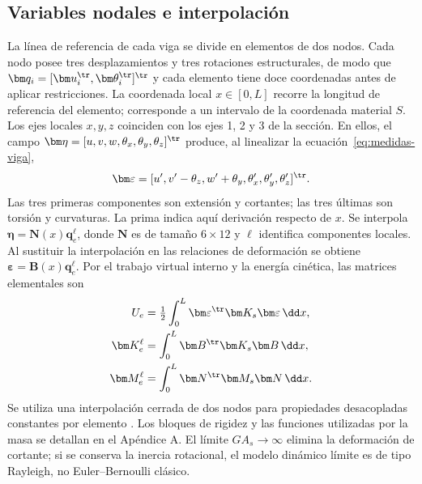 \subsection{Variables nodales e interpolación}
La línea de referencia de cada viga se divide en elementos de dos nodos. Cada nodo posee tres desplazamientos y tres rotaciones estructurales, de modo que
$\bm q_i=[\bm u_i^\tr,\bm\theta_i^\tr]^\tr$ y cada elemento tiene doce coordenadas antes de aplicar restricciones. La coordenada local $x\in[0,L]$ recorre la longitud de referencia del elemento; corresponde a un intervalo de la coordenada material $S$. Los ejes locales $x,y,z$ coinciden con los ejes 1, 2 y 3 de la sección. En ellos, el campo
$\bm\eta=[u,v,w,\theta_x,\theta_y,\theta_z]^\tr$
produce, al linealizar la ecuación~\eqref{eq:medidas-viga},
\begin{equation}
\bm\varepsilon=[u',v'-\theta_z,w'+\theta_y,
\theta_x',\theta_y',\theta_z']^\tr.
\end{equation}
Las tres primeras componentes son extensión y cortantes; las tres últimas son torsión y curvaturas. La prima indica aquí derivación respecto de $x$. Se interpola $\bm\eta=\bm N(x)\bm q_e^\ell$, donde $\bm N$ es de tamaño $6\times12$ y $\ell$ identifica componentes locales. Al sustituir la interpolación en las relaciones de deformación se obtiene $\bm\varepsilon=\bm B(x)\bm q_e^\ell$. Por el trabajo virtual interno y la energía cinética, las matrices elementales son
\begin{align}
U_e&=\tfrac12\int_0^L\bm\varepsilon^\tr\bm K_s\bm\varepsilon\,\dd x,\nonumber\\
\bm K_e^\ell&=\int_0^L\bm B^\tr\bm K_s\bm B\,\dd x,\nonumber\\
\bm M_e^\ell&=\int_0^L\bm N^\tr\bm M_s\bm N\,\dd x.
\label{eq:elementenergy}
\end{align}
Se utiliza una interpolación cerrada de dos nodos para propiedades desacopladas constantes por elemento \citep{reddy2006}. Los bloques de rigidez y las funciones utilizadas por la masa se detallan en el Apéndice A. El límite $GA_s\to\infty$ elimina la deformación de cortante; si se conserva la inercia rotacional, el modelo dinámico límite es de tipo Rayleigh, no Euler--Bernoulli clásico.

